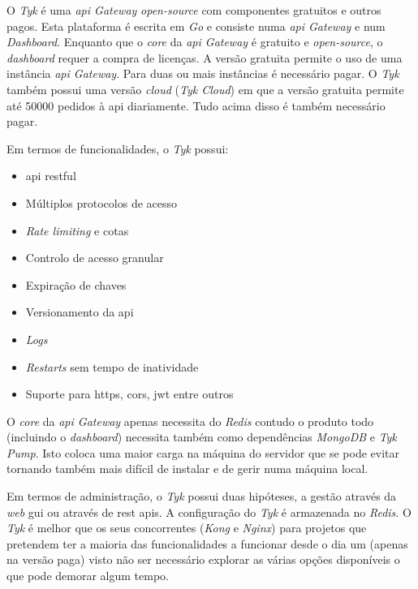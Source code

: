 O \textit{Tyk} é uma \textit{\acrshort{api} Gateway} \textit{open-source} com componentes gratuitos e outros pagos. Esta plataforma é escrita em \textit{Go} e consiste numa \textit{\acrshort{api} Gateway} e num \textit{Dashboard}. Enquanto que o \textit{core} da \textit{\acrshort{api} Gateway} é gratuito e \textit{open-source}, o \textit{dashboard} requer a compra de licenças. A versão gratuita permite o uso de uma instância \textit{\acrshort{api} Gateway}. Para duas ou mais instâncias é necessário pagar. O \textit{Tyk} também possui uma versão \textit{cloud} (\textit{Tyk Cloud}) em que a versão gratuita permite até 50000 pedidos à \acrshort{api} diariamente. Tudo acima disso é também necessário pagar.

Em termos de funcionalidades, o \textit{Tyk} possui:~\cite{tyk}
\begin{itemize}
    \item \acrshort{api} \acrshort{rest}ful
    \item Múltiplos protocolos de acesso
    \item \textit{Rate limiting} e cotas
    \item Controlo de acesso granular
    \item Expiração de chaves
    \item Versionamento da \acrshort{api}
    \item \textit{Logs}
    \item \textit{Restarts} sem tempo de inatividade
    \item Suporte para \acrshort{https}, \acrshort{cors}, \acrshort{jwt} entre outros
\end{itemize}

O \textit{core} da \textit{\acrshort{api} Gateway} apenas necessita do \textit{Redis} contudo o produto todo (incluindo o \textit{dashboard}) necessita também como dependências \textit{MongoDB} e \textit{Tyk Pump}. Isto coloca uma maior carga na máquina do servidor que se pode evitar tornando também mais difícil de instalar e de gerir numa máquina local.

Em termos de administração, o \textit{Tyk} possui duas hipóteses, a gestão através da \textit{web} \acrshort{gui} ou através de \acrshort{rest} \acrshort{api}s. A configuração do \textit{Tyk} é armazenada no \textit{Redis}. O \textit{Tyk} é melhor que os seus concorrentes (\textit{Kong} e \textit{Nginx}) para projetos que pretendem ter a maioria das funcionalidades a funcionar desde o dia um (apenas na versão paga) visto não ser necessário explorar as várias opções disponíveis o que pode demorar algum tempo.~\cite{compAPIGat}

